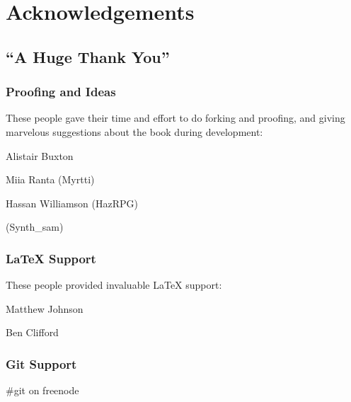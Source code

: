 \chapter{Acknowledgements}
\section{``A Huge Thank You''}

\subsection{Proofing and Ideas}
These people gave their time and effort to do forking and proofing, and giving marvelous suggestions about the book during development:

Alistair Buxton

Miia Ranta (Myrtti)

Hassan Williamson (HazRPG)

(Synth\_sam)

\subsection{\LaTeX{} Support}
These people provided invaluable \LaTeX{} support:

Matthew Johnson

Ben Clifford

\subsection{Git Support}
\#git on freenode

